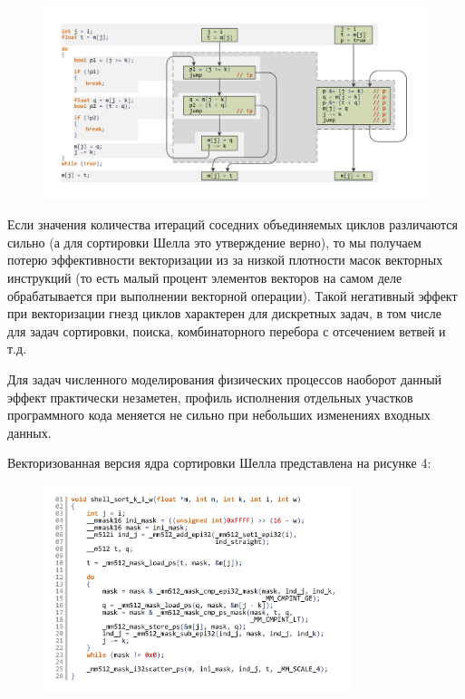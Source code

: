 \begin{figure}[ht]
	\centering
		\includegraphics[width=1.0\textwidth]{./pics/text_4_vec_irreg/shell_cfg.pdf}
	\caption{}
	\label{fig:text_4_vec_irreg_shell_cfg}
\end{figure}

Если значения количества итераций соседних объединяемых циклов различаются сильно (а для сортировки Шелла это утверждение верно), то мы получаем потерю эффективности векторизации из за низкой плотности масок векторных инструкций (то есть малый процент элементов векторов на самом деле обрабатывается при выполнении векторной операции).
Такой негативный эффект при векторизации гнезд циклов характерен для дискретных задач, в том числе для задач сортировки, поиска, комбинаторного перебора с отсечением ветвей и т.д.

Для задач численного моделирования физических процессов наоборот данный эффект практически незаметен, профиль исполнения отдельных участков программного кода меняется не сильно при небольших изменениях входных данных.

Векторизованная версия ядра сортировки Шелла представлена на рисунке 4:

\begin{figure}[ht]
	\centering
		\includegraphics[width=0.8\textwidth]{./pics/text_4_vec_irreg/shell_code_vec.pdf}
	\caption{}
	\label{fig:text_4_vec_irreg_shell_code_vec}
\end{figure}


